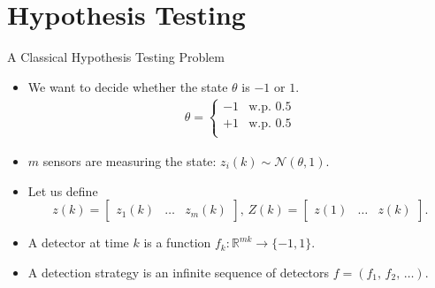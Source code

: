 \documentclass[10pt]{beamer}
\begin{document}
 \section{Hypothesis Testing}
 
 \frame{\tableofcontents[currentsection]}
 \begin{frame}{A Classical Hypothesis Testing Problem}
   \begin{itemize}
   \item We want to decide whether the state $\theta$ is $-1$ or $1$.
     \begin{align*}
       \theta=\begin{cases}
         -1 &\text{w.p.~}0.5\\
         +1 &\text{w.p.~}0.5\\
       \end{cases}
     \end{align*}
   \item $m$ sensors are measuring the state: $z_i(k)\sim\mathcal N(\theta,1)$.
   \item Let us define 
     \begin{displaymath}
       z(k) = \begin{bmatrix}z_1(k)&\dots&z_m(k)\end{bmatrix},\,Z(k) = \begin{bmatrix}z(1)&\dots&z(k)\end{bmatrix}.
     \end{displaymath}
   \item A detector at time $k$  is a function $f_k:\mathbb R^{mk}\rightarrow \{-1,1\}$.
   \item A detection strategy is an infinite sequence of detectors $f = (f_1,\,f_2,\,\dots)$.
   \end{itemize}
 \end{frame}
 
\end{document}
